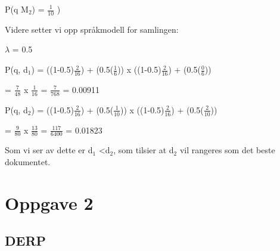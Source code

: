 \documentclass[]{article}
\begin{document}
\vspace{2mm}

P(q \textbar M$_{2}$) = $\frac{1}{10}$
)
\vspace{5mm}

\noindent Videre setter vi opp språkmodell for samlingen:\footnotemark[2]

\vspace{2mm}

$\lambda$ = 0.5

\vspace{2mm}

P(q, d$_{1}$) = ((1-0.5)$\frac{2}{16}$) + (0.5($\frac{1}{6}$))  x  ((1-0.5)$\frac{2}{16}$) + (0.5($\frac{0}{6}$))

\hspace{8.4ex} = $\frac{7}{48}$  x  $\frac{1}{16}$   =   $\frac{7}{768}$  =  0.00911  

\vspace{4mm}

P(q, d$_{2}$) = ((1-0.5)$\frac{2}{16}$) + (0.5($\frac{1}{10}$))  x  ((1-0.5)$\frac{2}{16}$) + (0.5($\frac{2}{10}$))

\hspace{8.4ex} = $\frac{9}{80}$  x  $\frac{13}{80}$   =   $\frac{117}{6400}$  =  0.01823  

\vspace{2mm} 

\noindent Som vi ser av dette er d$_{1}$ \textless d$_{2}$, som tilsier at d$_{2}$ vil rangeres som det beste dokumentet. 

\pagebreak

\section*{Oppgave 2}
\subsection*{DERP}

\pagebreak
\end{document}
